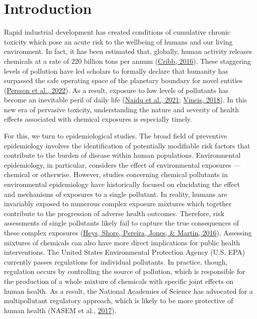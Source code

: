 \documentclass[12pt, twoside]{amherstthesis}
\begin{document}
  \listoftables

  \listoffigures


\mainmatter %
\pagestyle{fancyplain} %

\hypertarget{intro}{%
\chapter{Introduction}\label{intro}}

Rapid industrial development has created conditions of cumulative chronic toxicity which pose an acute risk to the wellbeing of humans and our living environment. In fact, it has been estimated that, globally, human activity releases chemicals at a rate of 220 billion tons per annum (\protect\hyperlink{ref-cribb_surviving_2016}{Cribb, 2016}). These staggering levels of pollution have led scholars to formally declare that humanity has surpassed the safe operating space of the planetary boundary for novel entities (\protect\hyperlink{ref-persson_outside_2022}{Persson et al., 2022}). As a result, exposure to low levels of pollutants has become an inevitable peril of daily life (\protect\hyperlink{ref-naidu_chemical_2021}{Naidu et al., 2021}; \protect\hyperlink{ref-vineis_john_2018}{Vineis, 2018}). In this new era of pervasive toxicity, understanding the nature and severity of health effects associated with chemical exposures is especially timely.

For this, we turn to epidemiological studies. The broad field of preventive epidemiology involves the identification of potentially modifiable risk factors that contribute to the burden of disease within human populations. Environmental epidemiology, in particular, considers the effect of environmental exposures --- chemical or otherwise. However, studies concerning chemical pollutants in environmental epidemiology have historically focused on elucidating the effect and mechanisms of exposures to a single pollutant. In reality, humans are invariably exposed to numerous complex exposure mixtures which together contribute to the progression of adverse health outcomes. Therefore, risk assessments of single pollutants likely fail to capture the true consequences of these complex exposures (\protect\hyperlink{ref-heys_risk_2016}{Heys, Shore, Pereira, Jones, \& Martin, 2016}). Assessing mixtures of chemicals can also have more direct implications for public health interventions. The United States Environmental Protection Agency (U.S. EPA) currently passes regulations for individual pollutants. In practice, though, regulation occurs by controlling the source of pollution, which is responsible for the production of a whole mixture of chemicals with specific joint effects on human health. As a result, the National Academies of Science has advocated for a multipollutant regulatory approach, which is likely to be more protective of human health (NASEM et al., \protect\hyperlink{ref-national_academies_of_sciences_engineering_and_medicine_using_2017}{2017}).
\end{document}
